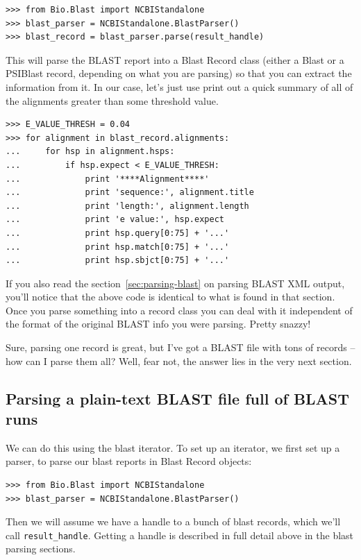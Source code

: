 \documentclass{report}
\begin{document}
\begin{verbatim}
>>> from Bio.Blast import NCBIStandalone
>>> blast_parser = NCBIStandalone.BlastParser()
>>> blast_record = blast_parser.parse(result_handle)
\end{verbatim}

This will parse the BLAST report into a Blast Record class (either a Blast or a PSIBlast record, depending on what you are parsing) so that you can extract the information from it. In our case, let's just use print out a quick summary of all of the alignments greater than some threshold value.

\begin{verbatim}
>>> E_VALUE_THRESH = 0.04
>>> for alignment in blast_record.alignments:
...     for hsp in alignment.hsps:
...         if hsp.expect < E_VALUE_THRESH:
...             print '****Alignment****'
...             print 'sequence:', alignment.title
...             print 'length:', alignment.length
...             print 'e value:', hsp.expect
...             print hsp.query[0:75] + '...'
...             print hsp.match[0:75] + '...'
...             print hsp.sbjct[0:75] + '...'
\end{verbatim}

If you also read the section~\ref{sec:parsing-blast} on parsing BLAST XML output, you'll notice that the above code is identical to what is found in that section. Once you parse something into a record class you can deal with it independent of the format of the original BLAST info you were parsing. Pretty snazzy!

Sure, parsing one record is great, but I've got a BLAST file with tons of records -- how can I parse them all? Well, fear not, the answer lies in the very next section.

\subsection{Parsing a plain-text BLAST file full of BLAST runs}

We can do this using the blast iterator. To set up an iterator, we first set up a parser, to parse our blast reports in Blast Record objects:

\begin{verbatim}
>>> from Bio.Blast import NCBIStandalone
>>> blast_parser = NCBIStandalone.BlastParser()
\end{verbatim}

Then we will assume we have a handle to a bunch of blast records, which we'll call \verb|result_handle|. Getting a handle is described in full detail above in the blast parsing sections.
\end{document}
